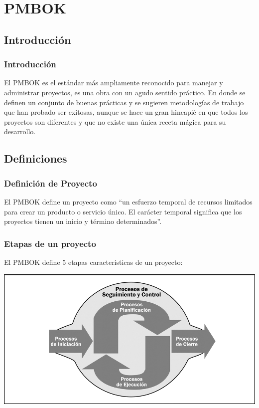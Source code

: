 \documentclass[12pt]{beamer}
\begin{document}
\section{PMBOK}
\subsection{Introducción}


\begin{frame}
\frametitle{Introducción}
El PMBOK es el estándar más ampliamente reconocido para manejar y administrar proyectos, es una obra con un agudo sentido práctico. En donde se definen un conjunto de buenas prácticas y se sugieren metodologías de trabajo que han probado ser exitosas, aunque se hace un gran hincapié en que todos los proyectos son diferentes y que no existe una única receta mágica para su desarrollo.  
\end{frame}

\subsection{Definiciones}
\begin{frame}
 \frametitle{Definición de Proyecto}
El PMBOK define un proyecto como \alert{``un esfuerzo temporal de recursos limitados para crear un producto o servicio único. El
carácter temporal significa que los proyectos tienen un inicio y término determinados''}.
\end{frame}


\begin{frame}
 \frametitle{Etapas de un proyecto}
El PMBOK define 5 etapas características de un proyecto:
\begin{center}
 \includegraphics[scale=0.35]{img/pmbok.png}
\end{center}
\end{frame}
\end{document}
